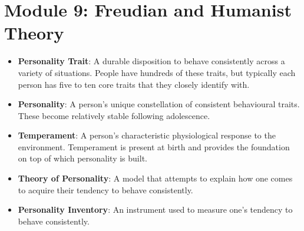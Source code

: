 \documentclass[10pt,letter]{article}
\theoremstyle{plain}
\theoremstyle{definition}
\begin{document}
\section*{Module 9: Freudian and Humanist Theory}
\begin{itemize}
    \item \textbf{Personality Trait}: A durable disposition to behave consistently across a variety of situations. People have hundreds of these traits, but typically each person has five to ten core traits that they closely identify with. 
    \item \textbf{Personality}: A person's unique constellation of consistent behavioural traits. These become relatively stable following adolescence. 
    \item \textbf{Temperament}: A person's characteristic physiological response to the environment. Temperament is present at birth and provides the foundation on top of which personality is built.
    \item \textbf{Theory of Personality}: A model that attempts to explain how one comes to acquire their tendency to behave consistently. 
    \item \textbf{Personality Inventory}: An instrument used to measure one's tendency to behave consistently. 
\end{itemize}
\end{document}
